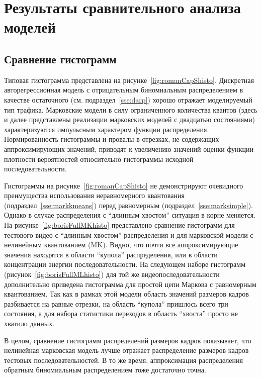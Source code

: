 \section{Результаты сравнительного анализа моделей}
\label{sec:results}

\subsection{Сравнение гистограмм}
\label{sub:histresults}

Типовая гистограмма представлена на рисунке~\ref{fig:romanCapShisto}.
Дискретная авторегрессионная модель с отрицательным биномиальным
распределением в качестве остаточного (см. подраздел~\ref{sse:darp})
хорошо отражает моделируемый тип трафика. Марковские модели
в силу ограниченного количества квантов (здесь и далее представлены
реализации марковских моделей с двадцатью состояниями)
характеризуются импульсным характером функции распределения.
Нормированность гистограммы и провалы в отрезках, не содержащих
аппроксимирующих значений, приводят к увеличению значений
оценки функции плотности вероятностей относительно гистограммы
исходной последовательности.

Гистограммы на рисунке~\ref{fig:romanCapShisto} не демонстрируют
очевидного преимущества использования неравномерного квантования
(подраздел~\ref{sse:markkmeans}) перед равномерным (подраздел~\ref{sse:marksimple}).
Однако в случае распределения с ``длинным хвостом'' ситуация в корне меняется.
На рисунке~\ref{fig:borisFullMKhisto} представлено сравнение гистограмм
для тестового видео с ``длинным хвостом'' распределения
и для марковской модели с нелинейным квантованием (MK).
Видно, что почти все аппроксимирующие
значения находятся в области ``купола'' распределения, или
в области концентрации энергии последовательности.
На следующем
наборе гистограмм (рисунок~\ref{fig:borisFullMLhisto})
для той же видеопоследовательности дополнительно приведена
гистограмма для простой цепи Маркова с равномерным квантованием.
Так как в рамках этой модели область значений размеров кадров
разбивается на равные отрезки, на область ``купола'' пришлось
всего три состояния, а для набора статистики переходов в область
``хвоста'' просто не хватило данных.

В целом, сравнение гистограмм распределений размеров кадров
показывает, что нелинейная марковская модель лучше отражает
распределение размеров кадров тестовых последовательностей.
В то же время, аппроксимация распределения обратным биномиальным
распределением тоже достаточно точна.

